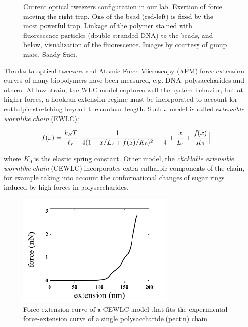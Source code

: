 \begin{figure}[h]
\caption[Optical Tweezers]{ Current
optical tweezers configuration in our lab. 
Exertion of force moving the right trap. One of the bead (red-left) is fixed by
the most powerful trap.  Linkage of the
 polymer stained with fluorescence particles (double stranded DNA) to the beads,
 and below, visualization of the fluorescence. Images by courtesy of group mate,
 Sandy Suei. }
\label{fig:optical_tweezers}
\end{figure}


Thanks to optical tweezers and Atomic Force Microscopy
(AFM)\citep{janshoff_force_2000} force-extension curves of many
biopolymers have been measured, e.g. DNA\citep{marko_stretching_1995},
polysaccharides\citep{marszalek_atomic_1999} and others. At low strain, the WLC
model captures well the system behavior, but at higher forces, a hookean
extension regime must be incorporated to account for enthalpic stretching
beyond the contour length.
Such a model is called \emph{extensible wormlike chain}
(EWLC)\citep{wang_stretching_1997}:

\begin{equation}\label{EWLC}
f(x)=\frac{k_B{}T}{\ell_p} \Big[ \frac{1}{4(1 - x/L_c + f(x)/K_0)^2}
-\frac{1}{4}+\frac{x}{L_c} + \frac{f(x)}{K_0}\Big]
\end{equation}


where $K_0$ is the elastic spring constant. Other model, the
\emph{clicklable extensible wormlike chain} (CEWLC) incorporates extra
enthalpic components of the chain, for example taking into
account the conformational changes of sugar rings induced by high forces in polysaccharides\citep{haverkamp_model_2007}.


\begin{figure}[h]
\begin{center}
\includegraphics[width=0.7\textwidth,height=0.5\textwidth]{Figures/forceextension_CEWLC.png}%

\caption[Force extension curve: CEWLC]{Force-extension curve of a CEWLC model
that fits the experimental force-extension curve of a single polysaccharide
(pectin) chain \citep{schuster_hierarchical_2011, haverkamp_model_2007} }
\label{fig:force_extension_CEWLC}
\end{center}
\end{figure}

